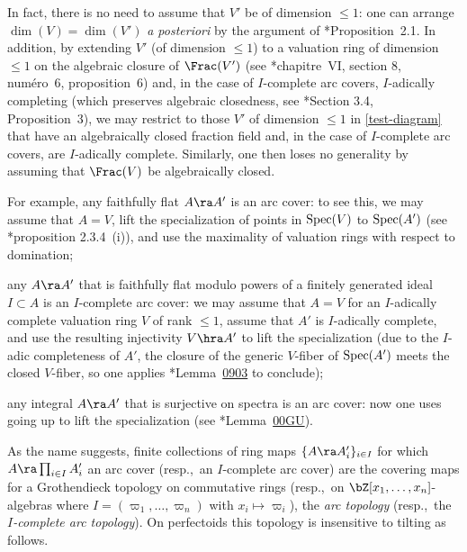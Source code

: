 In fact, there is no need to assume that $V'$ be of dimension $\le 1$: one can arrange $\dim(V) = \dim(V')$ \emph{a posteriori} by the argument of \cite{BM20}*{Proposition~2.1}.
In addition, by extending $V'$ (of dimension $\le 1$) to a valuation ring of dimension $\le 1$ on the algebraic closure of $\Frac(V')$ (see \cite{BouAC}*{chapitre~VI, section 8, num\'{e}ro~6, proposition~6}) and, in the case of $I$-complete arc covers, $I$-adically completing (which preserves algebraic closedness, see \cite{BGR84}*{Section 3.4, Proposition~3}), we may restrict to those $V'$ of dimension $\le 1$ in  \eqref{test-diagram}  that have an algebraically closed fraction field and, in the case of $I$-complete arc covers, are $I$-adically complete. Similarly, one then loses no generality by assuming that $\Frac(V)$ be algebraically closed.

For example,
\benuma
\m \label{arc-fflat}
any faithfully flat $A \ra A'$ is an arc cover: to see this, we may assume that $A = V$, lift the specialization of points in $\operatorname{Spec}(V)$ to $\operatorname{Spec}(A')$ (see \cite{EGAIV2}*{proposition 2.3.4~(i)}), and use the maximality of valuation rings with respect to domination; %

\m \label{arc-pi-fflat}
any $A \ra A'$ that is faithfully flat modulo powers of a finitely generated ideal $I \subset A$ is an $I$-complete arc cover: we may assume that $A = V$ for an $I$-adically complete valuation ring $V$ of rank $\le 1$, assume that $A'$ is $I$-adically complete, and use the resulting injectivity $V \hra A'$ to lift the specialization (due to the $I$-adic completeness of $A'$, the closure of the generic $V$-fiber of $\operatorname{Spec}(A')$ meets the closed $V$-fiber, so one applies \cite{SP}*{Lemma~\href{https://stacks.math.columbia.edu/tag/0903}{0903}} to conclude);

\m \label{arc-integral}
any integral $A \ra A'$ that is surjective on spectra is an arc cover: now one uses going up to lift the specialization (see \cite{SP}*{Lemma~\href{https://stacks.math.columbia.edu/tag/00GU}{00GU}}).
\eenum

As the name suggests, finite collections of ring maps $\{A \ra A'_i \}_{i \in I}$ for which $A \ra \prod_{i \in I} A'_i$ an arc cover (resp.,~an $I$-complete arc cover) are the covering maps for a Grothendieck topology on commutative rings (resp.,~on $\bZ[x_1, \dotsc, x_n]$-algebras where $I = (\varpi_1, \dotsc, \varpi_n)$ with $x_i \mapsto \varpi_i$), the \emph{arc topology} (resp.,~the \emph{$I$-complete arc topology}). On perfectoids this topology is insensitive to tilting as follows.
\epp



